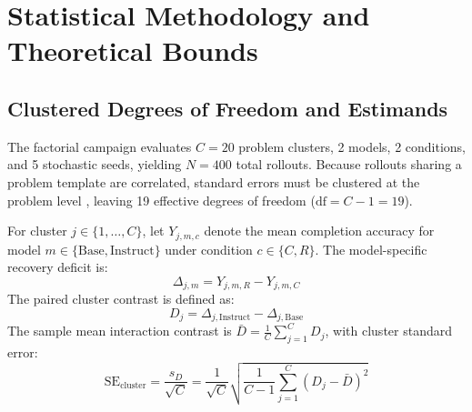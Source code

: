 \documentclass[11pt,letterpaper]{article}
\begin{document}
\section{Statistical Methodology and Theoretical Bounds}

\subsection{Clustered Degrees of Freedom and Estimands}
The factorial campaign evaluates $C=20$ problem clusters, 2 models, 2 conditions, and 5 stochastic seeds, yielding $N=400$ total rollouts. Because rollouts sharing a problem template are correlated, standard errors must be clustered at the problem level \cite{cameron2015practitioner}, leaving 19 effective degrees of freedom ($\text{df} = C - 1 = 19$).

For cluster $j \in \{1, \dots, C\}$, let $Y_{j, m, c}$ denote the mean completion accuracy for model $m \in \{\text{Base}, \text{Instruct}\}$ under condition $c \in \{C, R\}$. The model-specific recovery deficit is:
\begin{equation}
\Delta_{j, m} = Y_{j, m, R} - Y_{j, m, C}
\end{equation}
The paired cluster contrast is defined as:
\begin{equation}
D_j = \Delta_{j, \text{Instruct}} - \Delta_{j, \text{Base}}
\end{equation}
The sample mean interaction contrast is $\bar{D} = \frac{1}{C}\sum_{j=1}^{C} D_j$, with cluster standard error:
\begin{equation}
\mathrm{SE}_{\text{cluster}} = \frac{s_D}{\sqrt{C}} = \frac{1}{\sqrt{C}} \sqrt{\frac{1}{C-1}\sum_{j=1}^{C}(D_j - \bar{D})^2}
\end{equation}
\end{document}
